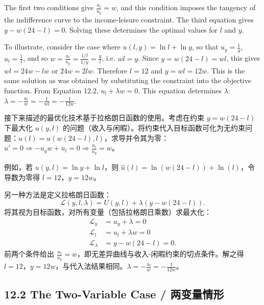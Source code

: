 \begin{original}
The first two conditions give $\frac{u_l}{u_y} = w$, and this condition imposes the tangency of the indifference curve to the income-leisure constraint. The third equation gives $y - w(24-l) = 0$. Solving these determines the optimal values for $l$ and $y$.

To illustrate, consider the case where $u(l, y) = \ln l + \ln y$, so that $u_y = \frac{1}{y}$, $u_l = \frac{1}{l}$, and so $w = \frac{u_l}{u_y} = \frac{1/l}{1/y} = \frac{y}{l}$, i.e. $wl = y$. Since $y = w(24-l) = wl$, this gives $wl = 24w - lw$ or $24w = 2lw$. Therefore $l = 12$ and $y = wl = 12w$. This is the same solution as was obtained by substituting the constraint into the objective function. From Equation 12.2, $u_l + \lambda w = 0$. This equation determines $\lambda$: $\lambda = -\frac{u_l}{w} = -\frac{1}{wl} = -\frac{1}{12w}$.
\end{original}
\begin{translation}
接下来描述的最优化技术基于拉格朗日函数的使用。考虑在约束 $y = w(24-l)$ 下最大化 $u(y, l)$ 的问题（收入与闲暇）。将约束代入目标函数可化为无约束问题：$\hat{u}(l) = u(w(24-l), l)$，求导并令其为零：$\hat{u}' = 0 \Rightarrow -u_y w + u_l = 0 \Rightarrow \frac{u_l}{u_y} = w$。

例如，若 $u(y, l) = \ln y + \ln l$，则 $\hat{u}(l) = \ln(w(24-l)) + \ln(l)$，令导数为零得 $l = 12$，$y = 12w$。

另一种方法是定义拉格朗日函数：
\[
\mathcal{L}(y, l, \lambda) = U(y, l) + \lambda(y - w(24-l)).
\]
将其视为目标函数，对所有变量（包括拉格朗日乘数）求最大化：
\begin{align}
\mathcal{L}_y &= u_y + \lambda = 0 \\
\mathcal{L}_l &= u_l + \lambda w = 0 \\
\mathcal{L}_\lambda &= y - w(24-l) = 0.
\end{align}
前两个条件给出 $\frac{u_l}{u_y} = w$，即无差异曲线与收入-闲暇约束的切点条件。解之得 $l = 12$，$y = 12w$，与代入法结果相同。$\lambda = -\frac{u_l}{w} = -\frac{1}{12w}$。
\end{translation}

\subsection{12.2 The Two-Variable Case / 两变量情形}

